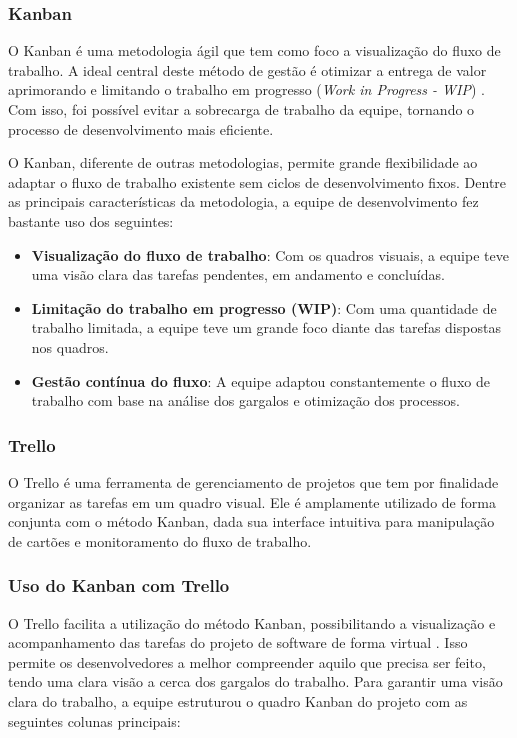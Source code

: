 \subsubsection{Kanban}
O Kanban é uma metodologia ágil que tem como foco a visualização do fluxo de trabalho. A ideal central deste método de gestão é otimizar a entrega de valor aprimorando e limitando o trabalho em progresso (\textit{Work in Progress - WIP}) \cite{kanban2025}. Com isso, foi possível evitar a sobrecarga de trabalho da equipe, tornando o processo de desenvolvimento mais eficiente.

O Kanban, diferente de outras metodologias, permite grande flexibilidade ao adaptar o fluxo de trabalho existente sem ciclos de desenvolvimento fixos. Dentre as principais características da metodologia, a equipe de desenvolvimento fez bastante uso dos seguintes:

\begin{itemize}
    \item \textbf{Visualização do fluxo de trabalho}: Com os quadros visuais, a equipe teve uma visão clara das tarefas pendentes, em andamento e concluídas.
    \item \textbf{Limitação do trabalho em progresso (WIP)}: Com uma quantidade de trabalho limitada, a equipe teve um grande foco diante das tarefas dispostas nos quadros.
    \item \textbf{Gestão contínua do fluxo}: A equipe adaptou constantemente o fluxo de trabalho com base na análise dos gargalos e otimização dos processos.
\end{itemize}

\subsubsection{Trello}
O Trello é uma ferramenta de gerenciamento de projetos que tem por finalidade organizar as tarefas em um quadro visual. Ele é amplamente utilizado de forma conjunta com o método Kanban, dada sua interface intuitiva para manipulação de cartões e monitoramento do fluxo de trabalho.

\subsubsection{Uso do Kanban com Trello}
O Trello facilita a utilização do método Kanban, possibilitando a visualização e acompanhamento das tarefas do projeto de software de forma virtual \cite{campos2023trello}. Isso permite os desenvolvedores a melhor compreender aquilo que precisa ser feito, tendo uma clara visão a cerca dos gargalos do trabalho. Para garantir uma visão clara do trabalho, a equipe estruturou o quadro Kanban do projeto com as seguintes colunas principais:

